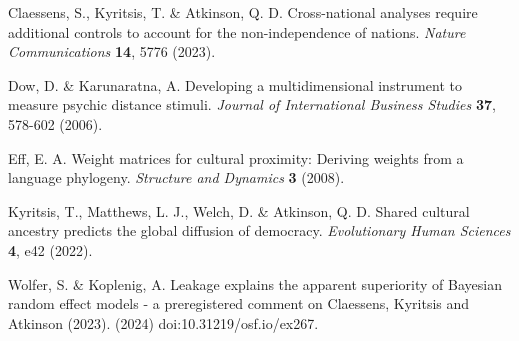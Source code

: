 \documentclass[
  11pt,
]{article}
\begin{document}
Claessens, S., Kyritsis, T. \& Atkinson, Q. D. Cross-national analyses require 
additional controls to account for the non-independence of nations.
\textit{Nature Communications} \textbf{14}, 5776 (2023).

Dow, D. \& Karunaratna, A. Developing a multidimensional instrument to measure 
psychic distance stimuli. \textit{Journal of International Business Studies}
\textbf{37}, 578-602 (2006).

Eff, E. A. Weight matrices for cultural proximity: Deriving weights from a 
language phylogeny. \textit{Structure and Dynamics} \textbf{3} (2008).

Kyritsis, T., Matthews, L. J., Welch, D. \& Atkinson, Q. D. Shared cultural 
ancestry predicts the global diffusion of democracy. \textit{Evolutionary Human 
Sciences} \textbf{4}, e42 (2022).

Wolfer, S. \& Koplenig, A. Leakage explains the apparent superiority of Bayesian
random effect models - a preregistered comment on Claessens, Kyritsis and 
Atkinson (2023). (2024) doi:10.31219/osf.io/ex267.
\end{document}
